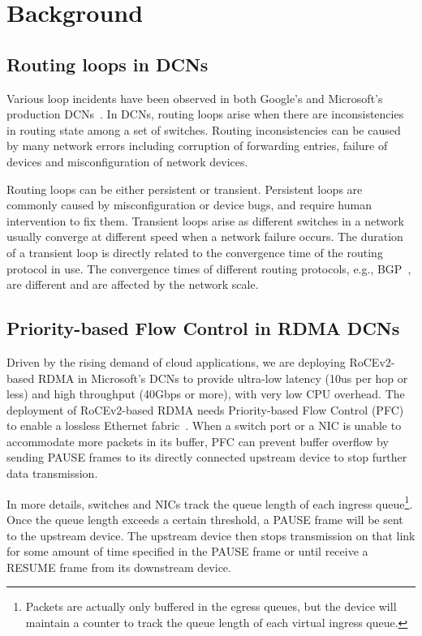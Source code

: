 
\section{Background}\label{sec:Background}

\subsection{Routing loops in DCNs}\label{subsec:loop}

Various loop incidents have been observed in both Google's and Microsoft's production DCNs~\cite{libra,everflow}. In DCNs, routing loops arise when there are inconsistencies in routing state among a set of switches. Routing inconsistencies can be caused by many network errors including corruption of forwarding entries, failure of devices and misconfiguration of network devices.

Routing loops can be either persistent or transient. Persistent loops are commonly caused by misconfiguration or device bugs, and require human intervention to fix them. Transient loops arise as different switches in a network usually converge at different speed when a network failure occurs. The duration of a transient loop is directly related to the convergence time of the routing protocol in use. The convergence times of different routing protocols, e.g., BGP~\cite{bgp}, are different and are affected by the network scale.

\subsection{Priority-based Flow Control in RDMA DCNs}\label{sec:rdma_dcns}


Driven by the rising demand of cloud applications, we are deploying RoCEv2-based RDMA in Microsoft's DCNs to provide ultra-low latency (10us per hop or less) and high throughput (40Gbps or more), with very low CPU overhead. The deployment of RoCEv2-based RDMA needs Priority-based Flow Control (PFC) to enable a lossless Ethernet fabric~\cite{dcqcn}. When a switch port or a NIC is unable to accommodate more packets in its buffer, PFC can prevent buffer overflow by sending PAUSE frames to its directly connected upstream device to stop further data transmission.

In more details, switches and NICs track the queue length of each ingress queue\footnote{Packets are actually only buffered in the egress queues, but the device will maintain a counter to track the queue length of each virtual ingress queue.}. Once the queue length exceeds a certain threshold, a PAUSE frame will be sent to the upstream device. The upstream device then stops transmission on that link for some amount of time specified in the PAUSE frame or until receive a RESUME frame from its downstream device.

